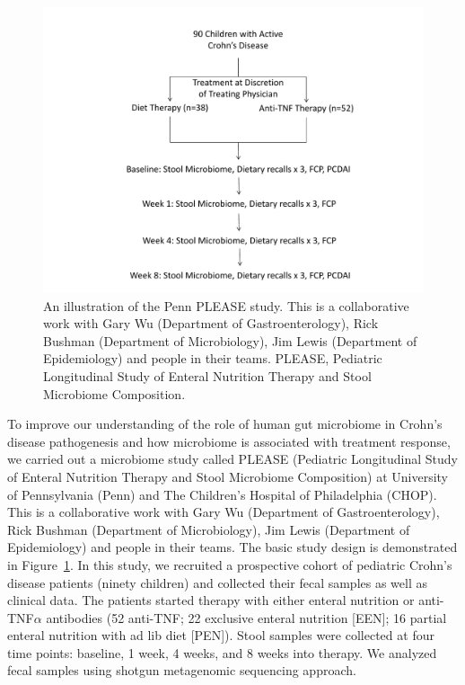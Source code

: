\begin{figure}[p]
	\begin{center}
		\includegraphics[scale=0.60,trim=40 0 0 0,clip]{Figure/F12_PLEASE_Study.pdf}
		\caption[An illustration of the PLEASE study at University of Pennsylvania.]{An illustration of the Penn PLEASE study. This is a collaborative work with Gary Wu (Department of Gastroenterology), Rick Bushman (Department of Microbiology), Jim Lewis (Department of Epidemiology) and people in their teams. PLEASE, Pediatric Longitudinal Study of Enteral Nutrition Therapy and Stool Microbiome Composition.} \label{F12_PLEASE_Study}
	\end{center}
\end{figure}




To improve our understanding of the role of human gut microbiome in Crohn's disease pathogenesis and how microbiome is associated with treatment response, we carried out a microbiome study called PLEASE  (Pediatric Longitudinal Study of Enteral Nutrition Therapy and Stool Microbiome Composition) at University of Pennsylvania (Penn) and The Children's Hospital of Philadelphia (CHOP). This is a collaborative work with Gary Wu (Department of Gastroenterology), Rick Bushman (Department of Microbiology), Jim Lewis (Department of Epidemiology) and people in their teams. The basic study design is demonstrated in Figure~\ref{F12_PLEASE_Study}.  In this study, we recruited a prospective cohort of pediatric Crohn's disease patients (ninety children) and collected their fecal samples as well as clinical data. The patients started therapy with either enteral nutrition or anti-TNF$\alpha$ antibodies (52 anti-TNF; 22 exclusive enteral nutrition [EEN]; 16 partial enteral nutrition with ad lib diet [PEN]). Stool samples were collected at four time points: baseline, 1 week, 4 weeks, and 8 weeks into therapy. We analyzed fecal samples using shotgun metagenomic sequencing approach.


